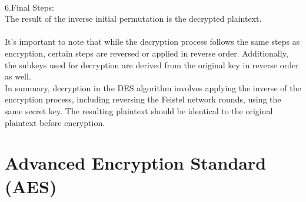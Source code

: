 \documentclass{report}
\begin{document}
\\
6.Final Steps:\\
The result of the inverse initial permutation is the decrypted plaintext.\\
\\
It's important to note that while the decryption process follows the same steps as encryption, certain steps are reversed or applied in reverse order. Additionally, the subkeys used for decryption are derived from the original key in reverse order as well.\\
In summary, decryption in the DES algorithm involves applying the inverse of the encryption process, including reversing the Feistel network rounds, using the same secret key. The resulting plaintext should be identical to the original plaintext before encryption.


\section{Advanced Encryption Standard (AES)}
\end{document}
